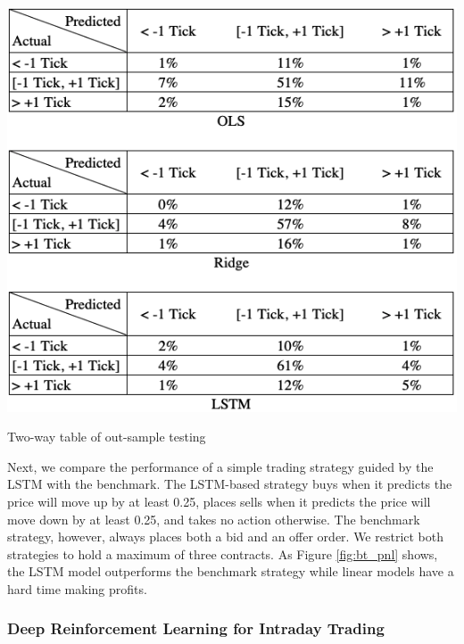 \documentclass{article}
\begin{document}
\begin{table}[h]
	\includegraphics[width=\linewidth]{tw_out_sample.png}
	\caption{Two-way table of out-sample testing} 
	\label{tab:tw_out}
\end{table}
Next, we compare the performance of a simple trading strategy guided by the LSTM with the benchmark. The LSTM-based strategy buys when it predicts the price will move up by at least 0.25, places sells when it predicts the price will move down by at least 0.25, and takes no action otherwise. The benchmark strategy, however, always places both a bid and an offer order. We restrict both strategies to hold a maximum of three contracts. As Figure \ref{fig:bt_pnl} shows, the LSTM model outperforms the benchmark strategy while linear models have a hard time making profits.

\subsubsection{Deep Reinforcement Learning for Intraday Trading}
\end{document}
